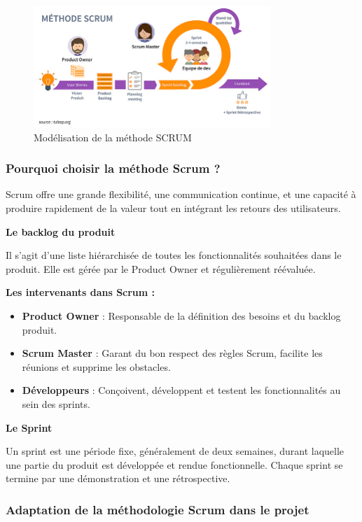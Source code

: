\begin{figure}[H]
    \centering
    \includegraphics[width=0.8\textwidth]{figures/scrum.jpg} %
    \caption{Modélisation de la méthode SCRUM}
    \label{fig:scrum-method}
\end{figure}

\subsubsection{Pourquoi choisir la méthode Scrum ?}

Scrum offre une grande flexibilité, une communication continue, et une capacité à produire rapidement de la valeur tout en intégrant les retours des utilisateurs.

\textbf{Le backlog du produit}

Il s’agit d’une liste hiérarchisée de toutes les fonctionnalités souhaitées dans le produit. Elle est gérée par le Product Owner et régulièrement réévaluée.

\textbf{Les intervenants dans Scrum :}
\begin{itemize}
    \item \textbf{Product Owner} : Responsable de la définition des besoins et du backlog produit.
    \item \textbf{Scrum Master} : Garant du bon respect des règles Scrum, facilite les réunions et supprime les obstacles.
    \item \textbf{Développeurs} : Conçoivent, développent et testent les fonctionnalités au sein des sprints.
\end{itemize}

\textbf{Le Sprint}

Un sprint est une période fixe, généralement de deux semaines, durant laquelle une partie du produit est développée et rendue fonctionnelle. Chaque sprint se termine par une démonstration et une rétrospective.

\subsubsection{Adaptation de la méthodologie Scrum dans le projet}


